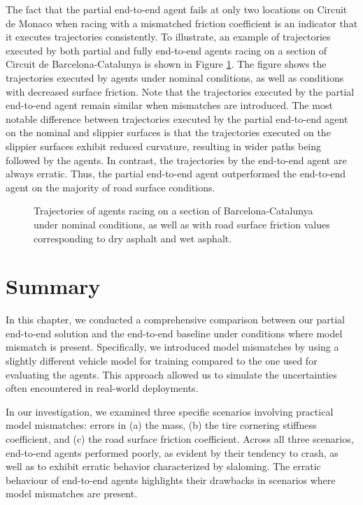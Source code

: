 The fact that the partial end-to-end agent fails at only two locations on Circuit de Monaco when racing with a mismatched friction coefficient is an indicator that
it executes trajectories consistently.
To illustrate, an example of trajectories executed by both partial and fully end-to-end agents racing on a section of Circuit de Barcelona-Catalunya is shown in Figure \ref{fig:mu_lap}.
The figure shows the trajectories executed by agents under nominal conditions, as well as conditions with decreased surface friction.
Note that the trajectories executed by the partial end-to-end agent remain similar when mismatches are introduced.
The most notable difference between trajectories executed by the partial end-to-end agent on the nominal and slippier surfaces is that the trajectories executed on the slippier surfaces exhibit reduced curvature, resulting in wider paths being followed by the agents.
In contrast, the trajectories by the end-to-end agent are always erratic.
Thus, the partial end-to-end agent outperformed the end-to-end agent on the majority of road surface conditions.

\begin{figure}[htb!]
    \centering
    
    \caption[Trajectories of agents racing with a decreased road surface friction coefficient]{Trajectories of agents racing on a section of Barcelona-Catalunya under nominal conditions, as well as with road surface friction values corresponding to dry asphalt and wet asphalt.}
    \label{fig:mu_lap}
\end{figure}

\section{Summary}

In this chapter, we conducted a comprehensive comparison between our partial end-to-end solution and the end-to-end baseline under conditions where model mismatch is present. 
Specifically, we introduced model mismatches by using a slightly different vehicle model for training compared to the one used for evaluating the agents. 
This approach allowed us to simulate the uncertainties often encountered in real-world deployments.


In our investigation, we examined three specific scenarios involving practical model mismatches: errors in (a) the mass, (b) the tire cornering stiffness coefficient, and (c) the road surface friction coefficient. 
Across all three scenarios, end-to-end agents performed poorly, as evident by their tendency to crash, as well as to exhibit erratic behavior characterized by slaloming.
The erratic behaviour of end-to-end agents highlights their drawbacks in scenarios where model mismatches are present.


